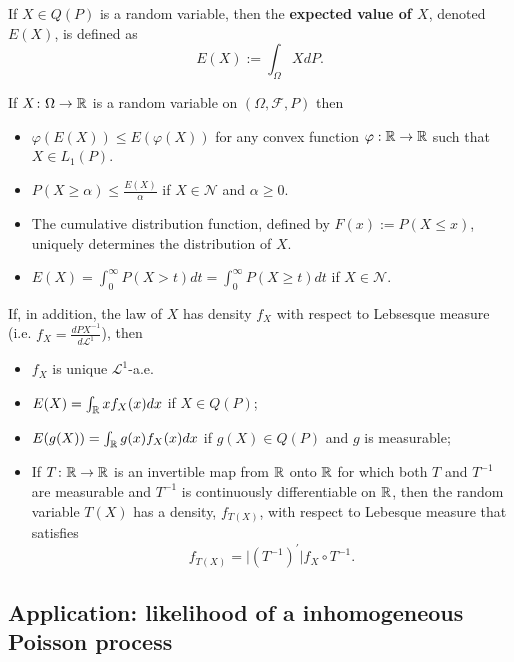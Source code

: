 \begin{definition} If $X\in Q(P)$ is a random variable, then the {\bf expected value of $X$}, denoted $E(X)$, is defined as
\[ E(X):=\int_\Omega XdP. \]
\end{definition}


\begin{theorem}
If $X\colon \Omega\rightarrow \Bbb R$ is a random variable on $(\Omega,\mathcal F, P)$ then
\begin{itemize}
\item $\varphi(E(X))\leq E(\varphi(X))$ for any  convex function $\varphi:\Bbb R\rightarrow \Bbb R$ such that $X\in L_1(P)$.
\item $P(X\geq \alpha)\leq \frac{E(X)}{\alpha}$ if $X\in \mathscr N$ and $\alpha\geq 0$.
\item The cumulative distribution function, defined by $F(x):=P(X\leq x)$, uniquely determines the distribution of $X$.
\item $E(X)= \int_0^\infty P(X>t)dt=\int_0^\infty P(X\geq t)dt$ if $X\in \mathscr N$.
\end{itemize}
If, in addition, the law of $X$ has density $f_X$ with respect to Lebsesque measure (i.e.\! $f_X= \frac{dP\!X^{-1}}{ d\mathcal L^1}$), then
\begin{itemize}
\item $f_X$ is unique $\mathcal L^1$-a.e.
\item $E(X)=\int_{\Bbb R} x f_X(x)d x$ if $X\in Q(P)$;
\item $E(g(X))=\int_{\Bbb R} g(x) f_X(x)dx$ if $g(X)\in Q(P)$ and $g$ is measurable;
\item  If $T\colon \Bbb R\rightarrow \Bbb R$ is an invertible map from $\Bbb R$ onto $\Bbb R$ for which both $T$ and $T^{-1}$ are measurable and  $T^{-1}$ is continuously differentiable on $\Bbb R$, then the random variable $T(X)$ has a density, $f_{T(X)}$, with respect to Lebesque measure that satisfies
\[ f_{T(X)} =  \bigl|(T^{-1})^\prime\bigr| f_X\circ T^{-1}. \]
\end{itemize}
\end{theorem}





\subsection{Application: likelihood of a inhomogeneous Poisson process}







